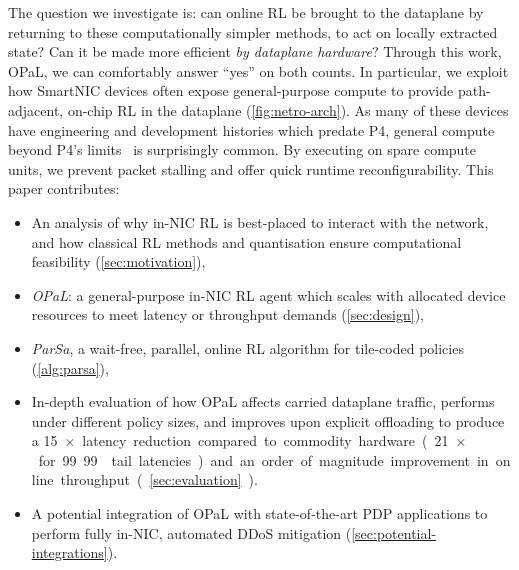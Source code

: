 \documentclass[
sigconf,natbib=false
]{acmart}
\newcommand{\approachshort}{OPaL}
\begin{document}







The question we investigate is: can online RL be brought to the dataplane by returning to these computationally simpler methods, to act on locally extracted state?
Can it be made more efficient \emph{by dataplane hardware}?
Through this work, \approachshort{}, we can comfortably answer ``yes'' on both counts.
In particular, we exploit how SmartNIC devices often expose general-purpose compute to provide path-adjacent, on-chip RL in the dataplane (\cref{fig:netro-arch}).
As many of these devices have engineering and development histories which predate P4, general compute beyond P4's limits~\parencite{p4-psa} is surprisingly common.
By executing on spare compute units, we prevent packet stalling and offer quick runtime reconfigurability.
This paper contributes:
\begin{itemize}
	\item An analysis of why in-NIC RL is best-placed to interact with the network, and how classical RL methods and quantisation ensure computational feasibility (\cref{sec:motivation}),
	\item \emph{\approachshort{}}: a general-purpose in-NIC RL agent which scales with allocated device resources to meet latency or throughput demands (\cref{sec:design}),
	\item \emph{ParSa}, a wait-free, parallel, online RL algorithm for tile-coded policies (\cref{alg:parsa}),
	\item In-depth evaluation of how \approachshort{} affects carried dataplane traffic, performs under different policy sizes, and improves upon explicit offloading to produce a \SI{15}{$\times$} latency reduction compared to commodity hardware (\SI{21}{$\times$} for 99.99 tail latencies) and an order of magnitude improvement in online throughput (\cref{sec:evaluation}).
	\item A potential integration of \approachshort{} with state-of-the-art PDP applications to perform fully in-NIC, automated DDoS mitigation (\cref{sec:potential-integrations}).
\end{itemize}
\end{document}
